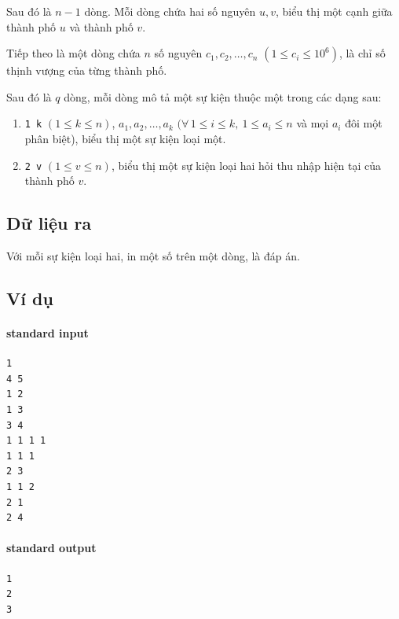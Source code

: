 \documentclass[11pt]{article}
\begin{document}
Sau đó là \(n-1\) dòng. Mỗi dòng chứa hai số nguyên \(u,v\), biểu thị một cạnh
giữa thành phố \(u\) và thành phố \(v\).

Tiếp theo là một dòng chứa \(n\) số nguyên \(c_1,c_2,\ldots,c_n\)
\((1\le c_i\le 10^6)\), là chỉ số thịnh vượng của từng thành phố.

Sau đó là \(q\) dòng, mỗi dòng mô tả một sự kiện thuộc một trong các dạng sau:
\begin{enumerate}
  \item \texttt{1 k} \((1\le k\le n)\), \(a_1,a_2,\ldots,a_k\)
  \((\forall\,1\le i\le k,\ 1\le a_i\le n\) và mọi \(a_i\) đôi một phân biệt),
  biểu thị một sự kiện loại một.
  \item \texttt{2 v} \((1\le v\le n)\), biểu thị một sự kiện loại hai hỏi thu
  nhập hiện tại của thành phố \(v\).
\end{enumerate}

\subsection*{Dữ liệu ra}

Với mỗi sự kiện loại hai, in một số trên một dòng, là đáp án.

\subsection*{Ví dụ}

\paragraph{standard input}
\begin{verbatim}
1
4 5
1 2
1 3
3 4
1 1 1 1
1 1 1
2 3
1 1 2
2 1
2 4
\end{verbatim}

\paragraph{standard output}
\begin{verbatim}
1
2
3
\end{verbatim}
\end{document}
